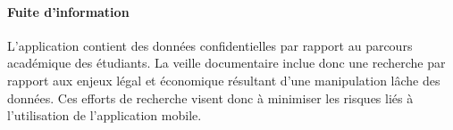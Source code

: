 	\paragraph{Fuite d'information} L'application contient des données confidentielles par rapport au parcours académique des étudiants. La veille documentaire inclue donc une recherche par rapport aux enjeux légal et économique résultant d'une manipulation lâche des données. Ces efforts de recherche visent donc à minimiser les risques liés à l'utilisation de l'application mobile.
		
	
	